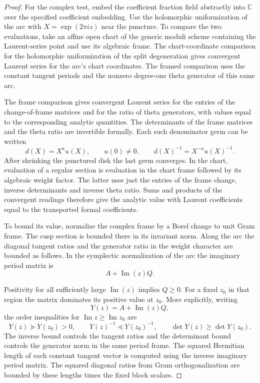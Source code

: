 \begin{proof}
 For the complex test,
embed the coefficient fraction field abstractly into
\(\mathbb C\) over the specified coefficient embedding.
Use the holomorphic uniformization of the arc with
\(X=\exp(2\pi i z)\) near the puncture. To compare
the two evaluations, take an affine open chart of the
generic moduli scheme containing the Laurent-series point
and use its algebraic frame. The chart-coordinate
comparison for the holomorphic uniformization of the
split degeneration gives convergent Laurent series for
the arc's chart coordinates. The framed comparison uses
the constant tangent periods and the nonzero degree-one
theta generator of this same arc.

The frame comparison gives convergent Laurent series for the entries of the change-of-frame
matrices and for the ratio of theta generators, with
values equal to the corresponding analytic quantities.
The determinants of the frame matrices and the theta
ratio are invertible formally. Each such denominator germ can be written
\[
 d(X)=X^a u(X),\qquad u(0)\ne0,\qquad d(X)^{-1}=X^{-a}u(X)^{-1}.
\]
After shrinking the punctured disk the last germ converges. In the chart, evaluation
of a regular section is evaluation in the chart frame
followed by its algebraic weight factor. The latter uses
just the entries of the frame change, inverse
determinants and inverse theta ratio. Sums and products
of the convergent readings therefore give the analytic
value with Laurent coefficients equal to the transported
formal coefficients.  \label{cor:theta-cover-integrality-1}

To bound its value, normalize the complex
frame by a Borel change to unit Gram frame.
The cusp section is bounded there in its invariant
norm. Along the arc the diagonal tangent ratios
and the generator ratio in the weight character are
bounded as follows. In the symplectic normalization of
the arc the imaginary period matrix is
\[
 A+\operatorname{Im}(z)Q.
\]

Positivity for all sufficiently large \(\operatorname{Im}(z)\)
implies \(Q\ge0\). For a fixed \(z_0\) in that region the
matrix dominates its positive value at \(z_0\). More explicitly, writing
\[
 Y(z)=A+\operatorname{Im}(z)Q,
\]
the order inequalities for \(\operatorname{Im}z\ge\operatorname{Im}z_0\)
are
\[
 Y(z)\succeq Y(z_0)>0,
 \qquad Y(z)^{-1}\preceq Y(z_0)^{-1},
 \qquad \det Y(z)\ge\det Y(z_0).
\]
The inverse bound controls the tangent ratios and the determinant
bound controls the generator norm in the same period frame. The squared Hermitian length of each constant
tangent vector is computed using the inverse imaginary
period matrix. The squared diagonal ratios from
Gram orthogonalization are bounded by these lengths
times the fixed block scalars.


\end{proof}
